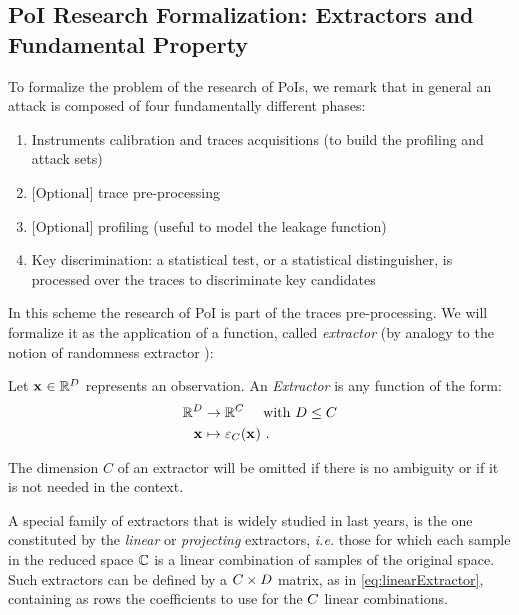 \subsection{PoI Research Formalization: Extractors and Fundamental Property}


To formalize the problem of the research of PoIs, we remark that in general an attack is composed of four fundamentally different phases:

\begin{enumerate}
\item Instruments calibration and traces acquisitions (to build the profiling and attack sets)
\item $\mbox{[Optional]}$ trace pre-processing
\item $\mbox{[Optional]}$  profiling (useful to model the leakage function)
\item Key discrimination: a  statistical test, or a statistical distinguisher, is processed over the  traces to discriminate key candidates
\end{enumerate}
In this scheme the research of PoI is part of the traces pre-processing. We will formalize it as the application of a function, called {\em extractor} (by analogy to the notion of randomness extractor \cite{DBLP:journals/jcss/NisanZ96}):

\begin{definition}
Let $\sss[]{}\in \mathbb{R}^\traceLength$ represents an observation. An  {\em Extractor}  is any function of the form:
\begin{align*}
\mathbb{R}^\traceLength & \rightarrow \mathbb{R}^\newTraceLength \quad \mbox{ with } \traceLength \leq \newTraceLength \\
\sss[]{} & \mapsto \extractor[\newTraceLength]{\sss[]{}} \mbox{ .}
\end{align*}
\end{definition}
\begin{notation}
The dimension $C$ of an extractor will be omitted if there is no ambiguity or if it is not needed in the context.
\end{notation}

\begin{example}
A special family of extractors that is widely studied in last years, is the one constituted by the {\em linear} or {\em projecting} extractors, \textit{i.e.} those for which each sample in the reduced space $\mathbb{\newTraceLength}$ is a linear combination of samples of the original space. Such extractors can be defined by a $\newTraceLength \times \traceLength$ matrix, as in \eqref{eq:linearExtractor}, containing as rows the coefficients to use for the $\newTraceLength$ linear combinations. 
\end{example}

